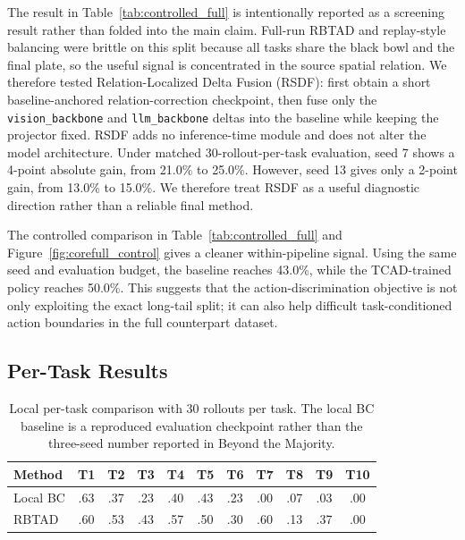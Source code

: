 The \liberospatiallt{} result in Table~\ref{tab:controlled_full} is intentionally reported as a screening result rather than folded into the main \liberocorelt{} claim. Full-run RBTAD and replay-style balancing were brittle on this split because all tasks share the black bowl and the final plate, so the useful signal is concentrated in the source spatial relation. We therefore tested Relation-Localized Delta Fusion (RSDF): first obtain a short baseline-anchored relation-correction checkpoint, then fuse only the \texttt{vision\_backbone} and \texttt{llm\_backbone} deltas into the baseline while keeping the projector fixed. RSDF adds no inference-time module and does not alter the model architecture. Under matched 30-rollout-per-task evaluation, seed 7 shows a 4-point absolute gain, from 21.0\% to 25.0\%. However, seed 13 gives only a 2-point gain, from 13.0\% to 15.0\%. We therefore treat RSDF as a useful diagnostic direction rather than a reliable final method.

The \liberocorefull{} controlled comparison in Table~\ref{tab:controlled_full} and Figure~\ref{fig:corefull_control} gives a cleaner within-pipeline signal. Using the same seed and evaluation budget, the baseline reaches 43.0\%, while the TCAD-trained policy reaches 50.0\%. This suggests that the action-discrimination objective is not only exploiting the exact long-tail split; it can also help difficult task-conditioned action boundaries in the full counterpart dataset.

\subsection{Per-Task Results}

\begin{table}[t]
  \centering
  \caption{Local per-task \liberocorelt{} comparison with 30 rollouts per task. The local BC baseline is a reproduced evaluation checkpoint rather than the three-seed number reported in Beyond the Majority.}
  \label{tab:corelt_tasks}
  \begin{tabular}{lcccccccccc}
    \toprule
    Method & T1 & T2 & T3 & T4 & T5 & T6 & T7 & T8 & T9 & T10 \\
    \midrule
    Local BC & .63 & .37 & .23 & .40 & .43 & .23 & .00 & .07 & .03 & .00 \\
    RBTAD & .60 & .53 & .43 & .57 & .50 & .30 & .60 & .13 & .37 & .00 \\
    \bottomrule
  \end{tabular}
\end{table}

